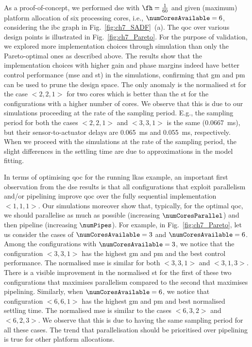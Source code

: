 As a proof-of-concept, we performed \gls{dse} with $\fh=\frac{1}{60}$ and given (maximum) platform allocation of six processing cores, i.e., $\numCoresAvailable=6$, considering the \gls{ibc} graph in Fig.~\ref{fig:ch7_SADF}~(a).
The \gls{qoc} over various design points is illustrated in Fig.~\ref{fig:ch7_Pareto}. For the purpose of validation, we explored more implementation choices through simulation than only the Pareto-optimal ones as described above.
The results show that the implementation choices with higher gain and phase margins indeed have better control performance (\gls{mse} and \gls{st}) in the simulations, confirming that \gls{gm} and \gls{pm} can be used to prune the design space. 
The only anomaly is the normalised \gls{st} for the case $<2,2,1>$ for two cores which is better than the \gls{st} for the configurations with a higher number of cores. 
We observe that this is due to our simulations proceeding at the rate of the sampling period. E.g., the sampling period for both the cases $<2,2,1>$ and $<3,3,1>$ is the same (0.0667~ms), but their sensor-to-actuator delays are 0.065~ms and 0.055~ms, respectively. When we proceed with the simulations at the rate of the sampling period, the slight differences in the settling time are due to approximations in the model fitting. 

In terms of optimising \gls{qoc} for the running \gls{lkas} example, an important first observation from the \gls{dse} results is that all configurations that exploit parallelism and/or pipelining improve \gls{qoc} over the fully sequential implementation $<1,1,1>$.
Our simulations moreover show that, typically, for the optimal \gls{qoc}, we should parallelise as much as possible (increasing $\numCoresParallel$) and then pipeline (increasing $\numPipes$).
For example, in Fig.~\ref{fig:ch7_Pareto}, let us consider the cases of $\numCoresAvailable=3$ and $\numCoresAvailable=6$.
Among the configurations with $\numCoresAvailable=3$, we notice that the configuration $<3,3,1>$ has the highest \gls{gm} and \gls{pm} and the best control performance. 
The normalised \gls{mse} is similar for both $<3,3,1>$ and $<3,1,3>$. There is a visible improvement in the normalised \gls{st} for the first of these two configurations that maximises parallelism compared to the second that maximises pipelining.
Similarly, when $\numCoresAvailable=6$, we notice that configuration $<6,6,1>$ has the highest \gls{gm} and \gls{pm} and best normalised settling time. 
The normalised \gls{mse} is similar to the cases $<6,3,2>$ and $<6,2,3>$. We observe that this is due to having the same sampling period for all these cases. 
The trend that parallelisation should be prioritised over pipelining is true for other platform allocations.

